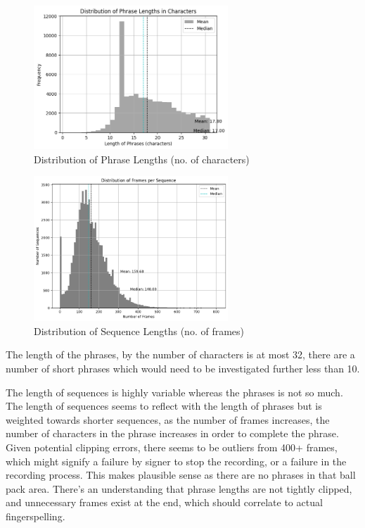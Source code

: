 \documentclass[preprint,11pt,review,authoryear]{elsarticle}
\begin{document}
\begin{figure}[h]
    \centering
    \includegraphics[width=0.65\textwidth]{images/distro_chars.png}
    \caption{Distribution of Phrase Lengths (no. of characters)}
    \label{fig:distro_chars}
\end{figure}

\begin{figure}[h]
    \centering
    \includegraphics[width=0.65\textwidth]{images/distro_frames.png}
    \caption{Distribution of Sequence Lengths (no. of frames)}
    \label{fig:distro_frames}
\end{figure}

The length of the phrases, by the number of characters is at most 32, there are a number of short phrases which would need to be investigated further less than 10. 

The length of sequences is highly variable whereas the phrases is not so much. The length of sequences seems to reflect with the length of phrases but is weighted towards shorter sequences, as the number of frames increases, the number of characters in the phrase increases in order to complete the phrase. Given potential clipping errors, there seems to be outliers from 400+ frames, which might signify a failure by signer to stop the recording, or a failure in the recording process. This makes plausible sense as there are no phrases in that ball pack area. There's an understanding that phrase lengths are not tightly clipped, and unnecessary frames exist at the end, which should correlate to actual fingerspelling.
\end{document}
